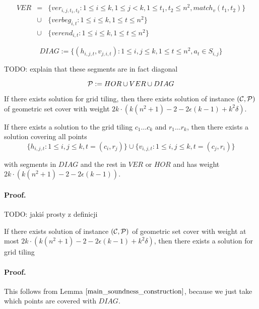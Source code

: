 \begin{eqnarray*}
VER &= &\{ver_{i, j, t_1, t_2} : 1 \le i \le k, 1 \le j < k,
1 \le t_1, t_2 \le n^2, match_v(t_1, t_2)\} \\
&\cup &\{verbeg_{i,t} : 1 \le i \le k, 1 \le t \le n^2\}
\\
&\cup &\{verend_{i,t} : 1 \le i \le k, 1 \le t \le n^2\}
\end{eqnarray*}

$$DIAG := \{ (h_{i, j, t}, v_{j, i, t}) :
	1 \le i, j \le k, 1 \le t \le n^2, a_t \in S_{i, j}\}$$

TODO: explain that these segments are in fact diagonal

$$\mathcal{P} := HOR \cup VER \cup DIAG$$



\begin{lemma}
	If there exists solution for grid tiling,
	then there exists solution of instance $(\mathcal{C}, \mathcal{P})$
	of geometric set cover
	with weight $2k \cdot (k(n^2+1) - 2 - 2\epsilon(k-1) + k^2\delta)$.
\end{lemma}

\begin{claim}
	If there exists a solution to the grid tiling
	$c_1 \ldots c_k$ and $r_1 \ldots r_k$,
	then there exists a solution covering
	all points
	$$\{h_{i, j, t} : 1 \le i, j \le k, t=(c_i, r_j)\}
	\cup \{v_{i, j, t} : 1 \le i, j \le k, t=(c_j, r_i)\}$$
	
	with segments in $DIAG$
	and the rest in $VER$ or $HOR$
	and has weight $2k \cdot (k(n^2+1) - 2 - 2\epsilon(k-1))$.
\end{claim}

\paragraph{Proof.}
TODO: jakiś prosty z definicji

\begin{lemma}
	If there exists solution  of instance $(\mathcal{C}, \mathcal{P})$
	of geometric set cover
	with weight at most $2k \cdot (k(n^2+1) - 2 - 2\epsilon(k-1)+ k^2\delta)$,
	then there exists a solution for grid tiling
\end{lemma}

\paragraph{Proof.}
This follows from Lemma $\ref{main_soundness_construction}$,
because we just take which points are covered with $DIAG$.

